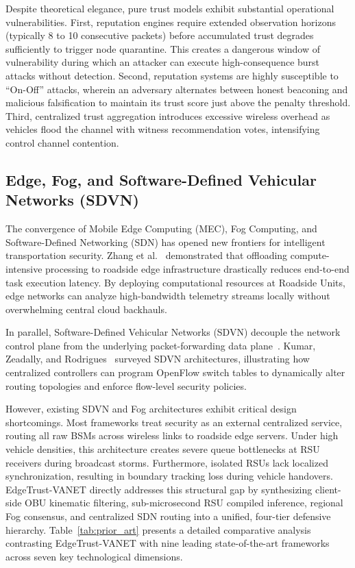 \documentclass[conference]{IEEEtran}
\begin{document}
Despite theoretical elegance, pure trust models exhibit substantial operational vulnerabilities. First, reputation engines require extended observation horizons (typically 8 to 10 consecutive packets) before accumulated trust degrades sufficiently to trigger node quarantine. This creates a dangerous window of vulnerability during which an attacker can execute high-consequence burst attacks without detection. Second, reputation systems are highly susceptible to ``On-Off'' attacks, wherein an adversary alternates between honest beaconing and malicious falsification to maintain its trust score just above the penalty threshold. Third, centralized trust aggregation introduces excessive wireless overhead as vehicles flood the channel with witness recommendation votes, intensifying control channel contention.

\subsection{Edge, Fog, and Software-Defined Vehicular Networks (SDVN)}

The convergence of Mobile Edge Computing (MEC), Fog Computing, and Software-Defined Networking (SDN) has opened new frontiers for intelligent transportation security. Zhang et al.~\cite{fogvanet} demonstrated that offloading compute-intensive processing to roadside edge infrastructure drastically reduces end-to-end task execution latency. By deploying computational resources at Roadside Units, edge networks can analyze high-bandwidth telemetry streams locally without overwhelming central cloud backhauls.

In parallel, Software-Defined Vehicular Networks (SDVN) decouple the network control plane from the underlying packet-forwarding data plane~\cite{sdnvanet, kamal2020sdn}. Kumar, Zeadally, and Rodrigues~\cite{sdnvanet} surveyed SDVN architectures, illustrating how centralized controllers can program OpenFlow switch tables to dynamically alter routing topologies and enforce flow-level security policies.

However, existing SDVN and Fog architectures exhibit critical design shortcomings. Most frameworks treat security as an external centralized service, routing all raw BSMs across wireless links to roadside edge servers. Under high vehicle densities, this architecture creates severe queue bottlenecks at RSU receivers during broadcast storms. Furthermore, isolated RSUs lack localized synchronization, resulting in boundary tracking loss during vehicle handovers. EdgeTrust-VANET directly addresses this structural gap by synthesizing client-side OBU kinematic filtering, sub-microsecond RSU compiled inference, regional Fog consensus, and centralized SDN routing into a unified, four-tier defensive hierarchy. Table~\ref{tab:prior_art} presents a detailed comparative analysis contrasting EdgeTrust-VANET with nine leading state-of-the-art frameworks across seven key technological dimensions.
\end{document}
